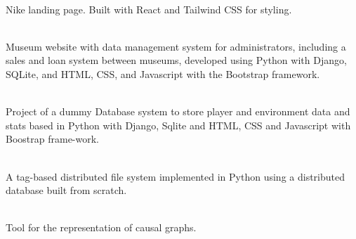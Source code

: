 \documentclass[9pt, blue]{./template/developercv} %
\begin{document}

\begin{minipage}[t]{0.70\textwidth}
	\vspace{-\baselineskip} %

	\vspace{1.2mm}
	\textcolor{accentbackground}{\faCode}\hspace{0.5mm}
	\small \textbf{} \\
	\footnotesize Nike landing page. Built with React and Tailwind CSS for styling.

	\vspace{1.2mm}
	\textcolor{accentbackground}{\faCode}\hspace{0.5mm}
	\small \textbf{} \\
	\footnotesize Museum website with data management system for administrators, including a sales and loan system between museums, developed using Python with Django, SQLite, and HTML, CSS, and Javascript with the Bootstrap framework.

	\vspace{1.2mm}
	\textcolor{accentbackground}{\faCode}\hspace{0.5mm}
	\small \textbf{} \\
	\footnotesize Project of a dummy Database system to store player and environment data and stats based in Python with Django, Sqlite and HTML, CSS and Javascript with Boostrap frame-work.

	\vspace{1.2mm}
	\textcolor{accentbackground}{\faCode}\hspace{0.5mm}
	\small \textbf{} \\
	\footnotesize A tag-based distributed file system implemented in Python using a distributed database built from scratch.

	\vspace{1.2mm}
	\textcolor{accentbackground}{\faCode}\hspace{0.5mm}
	\small \textbf{} \\
	\footnotesize Tool for the representation of causal graphs.


\end{minipage}
\end{document}
